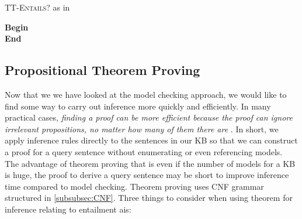\vspace{0.5cm}
\begin{algorithm}[H]
\label{algorithm:TT_entails}
\caption{\textsc{TT-Entails?} as in \citep{russell2016artificial}}
\SetAlgoLined
\DontPrintSemicolon
{}
\textbf{Begin} \\
\Indm 
\textbf{End}   \\
\end{algorithm}
\vspace{0.5cm}


\subsection{Propositional Theorem Proving}

Now that we we have looked at the model checking approach, we would like to find some way to carry out inference more quickly and efficiently. In many practical cases, \textit{finding a proof can be more efficient because the proof can ignore irrelevant propositions, no matter how many of them there are} \citep{russell2016artificial}. In short, we apply inference rules directly to the sentences in our KB so that we can construct a proof for a query sentence without enumerating or even referencing models. The advantage of theorem proving that is even if the number of models for a KB is huge, the proof to derive a query sentence may be short to improve inference time compared to model checking. Theorem proving uses CNF grammar structured in \ref{subsubsec:CNF}.
Three things to consider when using theorem for inference relating to entailment ais:

